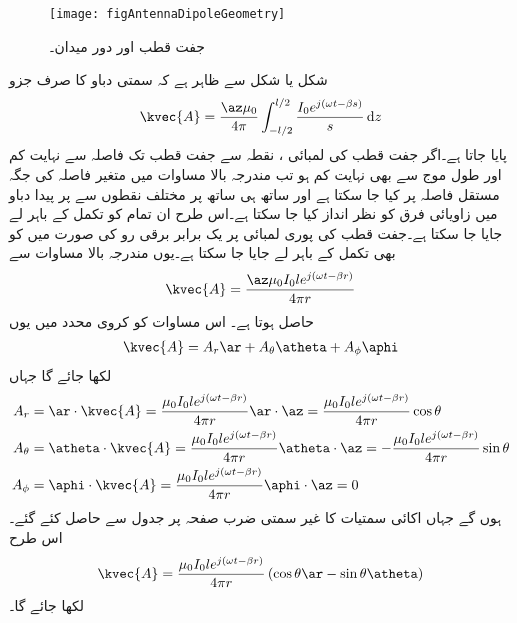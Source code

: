 \begin{figure}
\centering
\texttt{[image: figAntennaDipoleGeometry]}
\caption{جفت قطب اور دور میدان۔}
\label{شکل_اینٹینا_جفت_قطب_اور_دور_میدان}
\end{figure}
شکل  یا شکل  سے ظاہر ہے کہ سمتی دباو کا صرف  جزو
\begin{align}\label{مساوات_اینٹینا_جفت_قطب_سمتی_دباو_حصول}
\kvec{A}=\frac{\az \mu_0 }{4\pi} \int_{-l/2}^{l/2} \frac{I_0 e^{j(\omega t -\beta s)}}{s} \dif z
\end{align}
 پایا جاتا ہے۔اگر جفت قطب کی لمبائی ، نقطہ  سے جفت قطب تک فاصلہ  سے نہایت کم  اور طول موج  سے بھی نہایت کم  ہو تب مندرجہ بالا مساوات میں متغیر فاصلہ  کی جگہ مستقل فاصلہ  پر کیا جا سکتا ہے اور ساتھ ہی ساتھ  پر مختلف نقطوں سے   پر پیدا دباو میں زاویائی فرق کو نظر انداز کیا جا سکتا ہے۔اس طرح ان تمام کو تکمل کے باہر لے جایا جا سکتا ہے۔جفت قطب کی پوری لمبائی پر یک برابر برقی رو  کی صورت میں  کو بھی تکمل کے باہر لے جایا جا سکتا ہے۔یوں مندرجہ بالا مساوات سے
\begin{align}\label{مساوات_اینٹینا_جفت_قطب_سمتی_دباو_حاصل}
\kvec{A} =\frac{\az \mu_0 I_0 l e^{j(\omega t -\beta r)}}{4\pi r}
\end{align}
حاصل ہوتا ہے۔ اس مساوات کو کروی محدد میں یوں
\begin{align*}
\kvec{A}=A_r \ar +A_{\theta} \atheta +A_{\phi} \aphi
\end{align*}
لکھا جائے گا جہاں
\begin{gather}
\begin{aligned}\label{مساوات_اینٹینا_کروی_سمتی_دباو}
A_r&=\ar \cdot \kvec{A}= \frac{ \mu_0 I_0 l e^{j(\omega t -\beta r)}}{4\pi r} \ar \cdot \az= \frac{ \mu_0 I_0 l e^{j(\omega t -\beta r)}}{4\pi r} \cos \theta\\
A_{\theta}&=\atheta \cdot \kvec{A}=\frac{ \mu_0 I_0 l e^{j(\omega t -\beta r)}}{4\pi r} \atheta \cdot \az =-\frac{ \mu_0 I_0 l e^{j(\omega t -\beta r)}}{4\pi r} \sin \theta \\
A_{\phi}&=\aphi \cdot \kvec{A}=\frac{ \mu_0 I_0 l e^{j(\omega t -\beta r)}}{4\pi r} \aphi \cdot \az =0
\end{aligned}
\end{gather}
ہوں گے جہاں اکائی سمتیات کا غیر سمتی ضرب صفحہ  پر جدول  سے حاصل کئے گئے۔اس طرح 
\begin{align}\label{مساوات_اینٹینا_جفت_قطب_سمتی_دباو}
\kvec{A}=\frac{ \mu_0 I_0 l e^{j(\omega t -\beta r)}}{4\pi r}\left(\cos \theta \ar-\sin \theta \atheta \right)
\end{align}
لکھا جائے گا۔


